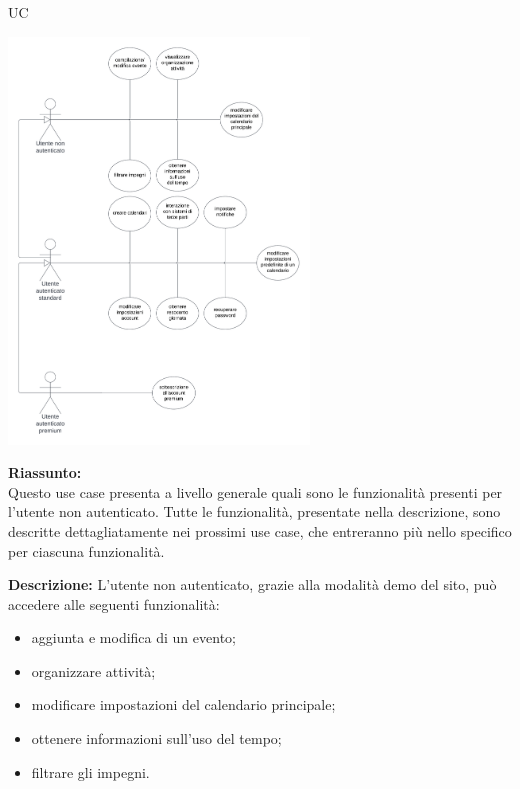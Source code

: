 \begin{listaPersonale}{UC}
    \begin{center}
        \includegraphics[width=0.6\textwidth, height = 0.5\textheight]{img/Diagrammi/UseCases/FunzionalitaUtenti.png}
    \end{center}
    \begin{listaPersonale2} [UC] {}
                \textbf{Riassunto:} \\
                Questo use case presenta a livello generale quali sono le funzionalità presenti per l'utente non autenticato. Tutte le funzionalità, presentate nella descrizione, sono descritte dettagliatamente nei prossimi use case, che entreranno più nello specifico per ciascuna funzionalità.

                \textbf{Descrizione:}
                L'utente non autenticato, grazie alla modalità demo del sito, può accedere alle seguenti funzionalità:
                \begin{itemize}
                    \item aggiunta e modifica di un evento;
                    \item organizzare attività;
                    \item modificare impostazioni del calendario principale;
                    \item ottenere informazioni sull'uso del tempo;
                    \item filtrare gli impegni.
                \end{itemize}


\end{listaPersonale2}
\end{listaPersonale}
